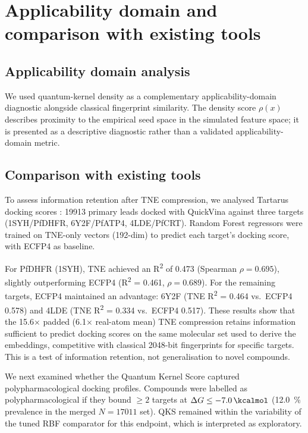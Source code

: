 \documentclass[11pt,a4paper]{article}
\begin{document}
\vspace{4mm}


\section{Applicability domain and comparison with existing tools}

\subsection{Applicability domain analysis}

We used quantum-kernel density as a complementary applicability-domain diagnostic alongside classical fingerprint similarity. The density score $\rho(x)$ describes proximity to the empirical seed space in the simulated feature space; it is presented as a descriptive diagnostic rather than a validated applicability-domain metric.

\subsection{Comparison with existing tools}

To assess information retention after TNE compression, we analysed Tartarus docking scores \citep{tartarus_2024}: \num{19913} primary leads docked with QuickVina against three targets (1SYH/PfDHFR, 6Y2F/PfATP4, 4LDE/PfCRT). Random Forest regressors were trained on TNE-only vectors (\num{192}-dim) to predict each target's docking score, with ECFP4 as baseline.

For PfDHFR (1SYH), TNE achieved an R\textsuperscript{2} of \num{0.473} (Spearman $\rho = \num{0.695}$), slightly outperforming ECFP4 (R\textsuperscript{2} = \num{0.461}, $\rho = \num{0.689}$). For the remaining targets, ECFP4 maintained an advantage: 6Y2F (TNE R\textsuperscript{2} = \num{0.464} vs.\ ECFP4 \num{0.578}) and 4LDE (TNE R\textsuperscript{2} = \num{0.334} vs.\ ECFP4 \num{0.517}). These results show that the \num{15.6}$\times$ padded (\num{6.1}$\times$ real-atom mean) TNE compression retains information sufficient to predict docking scores on the same molecular set used to derive the embeddings, competitive with classical \num{2048}-bit fingerprints for specific targets. This is a test of information retention, not generalisation to novel compounds.

We next examined whether the Quantum Kernel Score captured polypharmacological docking profiles. Compounds were labelled as polypharmacological if they bound $\geq 2$ targets at $\Delta G \leq -\SI{7.0}{\kcalmol}$ (\qty{12.0}{\percent} prevalence in the merged $N=\num{17011}$ set). QKS remained within the variability of the tuned RBF comparator for this endpoint, which is interpreted as exploratory.
\end{document}
